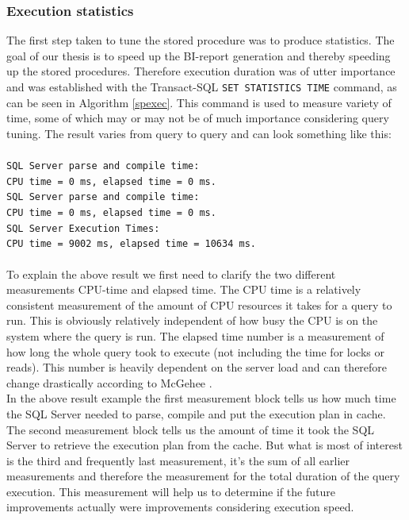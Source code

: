 \documentclass{cslthse-msc}
\begin{document}
\subsubsection{Execution statistics}
The first step taken to tune the stored procedure was to produce statistics. The goal of our thesis is to speed up the BI-report generation and thereby speeding up the stored procedures. Therefore execution duration was of utter importance and was established with the Transact-SQL \texttt{SET STATISTICS TIME} command, as can be seen in Algorithm \ref{spexec}. This command is used to measure variety of time, some of which may or may not be of much importance considering query tuning. The result varies from query to query and can look something like this: \\\\\texttt{SQL Server parse and compile time:\\
CPU time = 0 ms, elapsed time = 0 ms.\\
SQL Server parse and compile time:\\
CPU time = 0 ms,  elapsed time = 0 ms.\\
SQL Server Execution Times:\\
CPU time = 9002 ms,  elapsed time = 10634 ms.
}\\\\
To explain the above result we first need to clarify the two different measurements CPU-time and elapsed time. The CPU time is a relatively consistent measurement of the amount of CPU resources it takes for a query to run. This is obviously relatively independent of how busy the CPU is on the system where the query is run. The elapsed time number is a measurement of how long the whole query took to execute (not including the time for locks or reads). This number is heavily dependent on the server load and can therefore change drastically according to McGehee \cite{statistics}. \\ In the above result example the first measurement block tells us how much time the SQL Server needed to parse, compile and put the execution plan in cache. The second measurement block tells us the amount of time it took the SQL Server to retrieve the execution plan from the cache. But what is most of interest is the third and frequently last measurement, it's the sum of all earlier measurements and therefore the measurement for the total duration of the query execution. This measurement will help us to determine if the future improvements actually were improvements considering execution speed.\\
\end{document}

